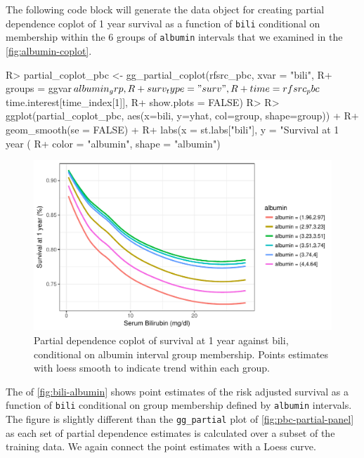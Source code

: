 \documentclass[article]{jss}
\begin{document}
The following code block will generate the data object for creating
partial dependence coplot of 1 year survival as a function of
\texttt{bili} conditional on membership within the 6 groups of
\texttt{albumin} intervals that we examined in the
\autoref{fig:albumin-coplot}.

\begin{Schunk}
\begin{Sinput}
R> partial_coplot_pbc <- gg_partial_coplot(rfsrc_pbc, xvar = "bili",
R+                                         groups = ggvar$albumin_grp,
R+                                         surv_type = "surv",
R+                                         time = rfsrc_pbc$time.interest[time_index[1]],
R+                                         show.plots = FALSE)
R> 
R> ggplot(partial_coplot_pbc, aes(x=bili, y=yhat, col=group, shape=group)) +
R+   geom_smooth(se = FALSE) +
R+   labs(x = st.labs["bili"], y = "Survival at 1 year (%
R+        color = "albumin", shape = "albumin")
\end{Sinput}
\begin{figure}[!htb]

{\centering \includegraphics{rfs-bili-albumin-1} 

}

\caption[Partial dependence coplot of survival at 1 year against bili, conditional on albumin interval group membership]{Partial dependence coplot of survival at 1 year against bili, conditional on albumin interval group membership. Points estimates with loess smooth to indicate trend within each group.}\label{fig:bili-albumin}
\end{figure}
\end{Schunk}

The  of \autoref{fig:bili-albumin} shows point
estimates of the risk adjusted survival as a function of \texttt{bili}
conditional on group membership defined by \texttt{albumin} intervals.
The figure is slightly different than the \texttt{gg\_partial} plot of
\autoref{fig:pbc-partial-panel} as each set of partial dependence
estimates is calculated over a subset of the training data. We again
connect the point estimates with a Loess curve.
\end{document}
